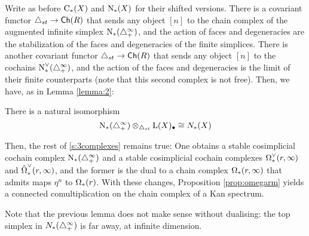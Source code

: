 Write as before $\operatorname{C}_{*}(X)$ and $\operatorname{N}_{*}(X)$ for their shifted versions. There is a covariant functor $\triangle_{st}\to \mathsf{Ch}(R)$ that sends any object $[n]$ to the chain complex of the augmented infinite simplex $\operatorname{N}_{*}(\triangle_{+}^\infty)$, and the action of faces and degeneracies are the stabilization of the faces and degeneracies of the finite simplices. There is another covariant functor $\triangle_{st}\to \mathsf{Ch}(R)$ that sends any object $[n]$ to the cochains $\operatorname{N}^\vee_{*}(\triangle_{+}^\infty)$, and the action of the faces and degeneracies is the limit of their finite counterparts (note that this second complex is not free). Then, we have, as in Lemma \ref{lemma:2}:

\begin{lemma}
    There is a natural isomorphism
\[
    \operatorname{N}_{*}(\triangle_{+}^{\infty})\otimes_{\triangle_{st}} \operatorname{L}(X)_\bullet \cong N_{*}(X)
\]
\end{lemma}

Then, the rest of \cref{s:3complexes} remains true: One obtains a stable cosimplicial cochain complex $\operatorname{N}_{*}(\triangle_{+}^\infty)$ and a stable cosimplicial cochain complexes $\operatorname{\Omega}^{\vee}_{*}(r,\infty)$ and $\hat{\operatorname{\Omega}}^{\vee}_{*}(r,\infty)$, and the former is the dual to a chain complex $\operatorname{\Omega}_{*}(r,\infty)$ that admits maps $\eta^{n}$ to $\operatorname{\Omega}_{*}(r)$. With these changes, Proposition \ref{prop:omegarm} yields a connected comultiplication on the chain complex of a Kan spectrum.

Note that the previous lemma does not make sense without dualising: the top simplex in $N_*(\triangle_{+}^\infty)$ is far away, at infinite dimension.



